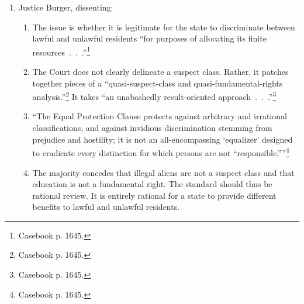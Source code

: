 \begin{enumerate}
\begin{enumerate}
\begin{enumerate}
            But the state takes no measures against citizens to ensure they 
            remain in the state.
        \end{enumerate}
        \item ``It is difficult to understand precisely what the State hopes 
        to achieve by promoting the creation and perpetuation of a subclass of 
        illiterates within out boundaries, surely adding to the problems and 
        costs of unemployment, welfare, crime.''\footnote{Casebook p. 1644.}
        \item The law did not further a substantial state interest.
    \end{enumerate}
    \item Justice Burger, dissenting:
    \begin{enumerate}
        \item The issue is whether it is legitimate for the state to 
        discriminate between lawful and unlawful residents ``for purposes of 
        allocating its finite resources~.~.~.''\footnote{Casebook p. 1645.}
        \item The Court does not clearly delineate a suspect class. Rather, it 
        patches together pieces of a ``quasi-suspect-class and 
        quasi-fundamental-rights analysis.''\footnote{Casebook p. 1645.} It 
        takes ``an unabashedly result-oriented 
        approach~.~.~.''\footnote{Casebook p. 1645.}
        \item ``The Equal Protection Clause protects against arbitrary and 
        irrational classifications, and against invidious discrimination 
        stemming from prejudice and hostility; it is not an all-encompassing 
        `equalizer' designed to eradicate every distinction for which persons 
        are not \enquote{responsible.}''\footnote{Casebook p. 1645.}
        \item The majority concedes that illegal aliens are not a suspect 
        class and that education is not a fundamental right. The standard 
        should thus be rational review. It is entirely rational for a state to 
        provide different benefits to lawful and unlawful residents.
    \end{enumerate}
\end{enumerate}

